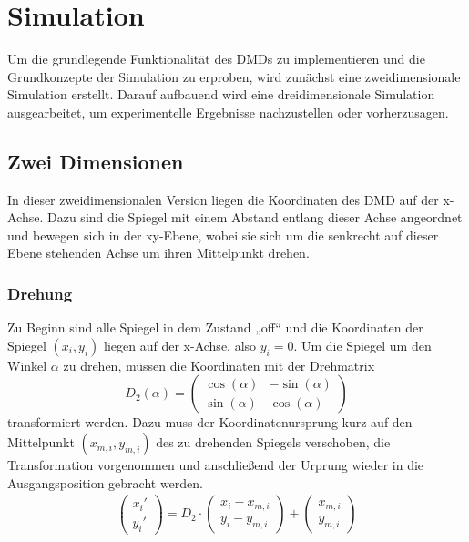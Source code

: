 \section{Simulation}
Um die grundlegende Funktionalität des DMDs zu implementieren und die Grundkonzepte der Simulation zu erproben, wird zunächst eine zweidimensionale Simulation erstellt. Darauf aufbauend wird eine dreidimensionale Simulation ausgearbeitet, um experimentelle Ergebnisse nachzustellen oder vorherzusagen.


\subsection{Zwei Dimensionen}
In dieser zweidimensionalen Version liegen die Koordinaten des DMD auf der x-Achse. Dazu sind die Spiegel mit einem Abstand entlang dieser Achse angeordnet und bewegen sich in der xy-Ebene, wobei sie sich um die senkrecht auf dieser Ebene stehenden Achse um ihren Mittelpunkt drehen.
\subsubsection{Drehung}
Zu Beginn sind alle Spiegel in dem Zustand „off“ und die Koordinaten der Spiegel $(x_i, y_i)$ liegen auf der x-Achse, also $y_i=0$. Um die Spiegel um den Winkel $\alpha$ zu drehen, müssen die Koordinaten mit der Drehmatrix
\begin{equation}
    D_2(\alpha)=\left(\begin{matrix}
        \cos(\alpha) & -\sin(\alpha)\\ 
        \sin(\alpha) & \cos(\alpha)
    \end{matrix}\right)
\end{equation}
transformiert werden. Dazu muss der Koordinatenursprung kurz auf den Mittelpunkt $(x_{m,i}, y_{m,i})$ des zu drehenden Spiegels verschoben, die Transformation vorgenommen und anschließend der Urprung wieder in die Ausgangsposition gebracht werden.
\begin{equation}
    \begin{aligned}
        \left(\begin{matrix}
            x_i'\\y_i'
        \end{matrix}\right) =
        D_2 \cdot
        \left(\begin{matrix}
            x_i - x_{m,i}\\ 
            y_i - y_{m,i}
        \end{matrix}\right) + 
        \left(\begin{matrix}
            x_{m,i}\\ 
            y_{m,i}
        \end{matrix}\right)
    \end{aligned}
\end{equation}

